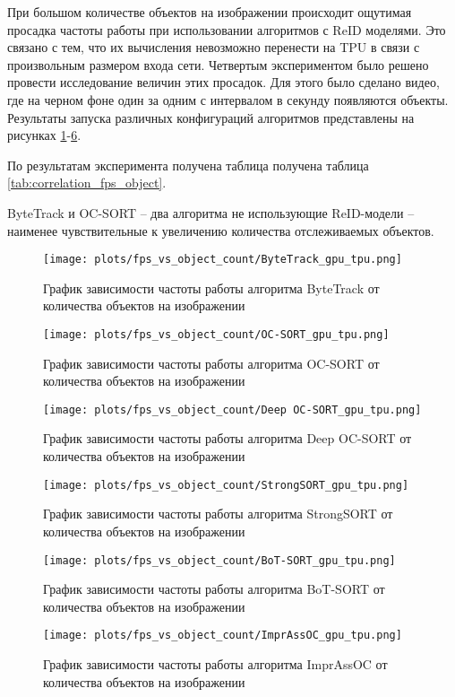 При большом количестве объектов на изображении происходит ощутимая просадка частоты работы при использовании алгоритмов с ReID моделями. 
Это связано с тем, что их вычисления невозможно перенести на TPU в связи с произвольным размером входа сети.  
Четвертым экспериментом было решено провести исследование величин этих просадок. Для этого было сделано видео, где на черном фоне один за одним с интервалом в секунду появляются объекты. 
Результаты запуска различных конфигураций алгоритмов представлены на рисунках \ref{fig:fps_object_ByteTrack}-\ref{fig:fps_object_ImprAssOC}.

По результатам эксперимента получена таблица получена таблица \ref{tab:correlation_fps_object}. 

ByteTrack и OC-SORT -- два алгоритма не использующие ReID-модели -- наименее чувствительные к увеличению количества отслеживаемых объектов.
\begin{figure}[ht]
    \centering
    \texttt{[image: plots/fps\_vs\_object\_count/ByteTrack\_gpu\_tpu.png]}
    \caption{График зависимости частоты работы алгоритма ByteTrack от количества объектов на изображении}
    \label{fig:fps_object_ByteTrack}
\end{figure}

\begin{figure}[ht]
    \centering
    \texttt{[image: plots/fps\_vs\_object\_count/OC-SORT\_gpu\_tpu.png]}
    \caption{График зависимости частоты работы алгоритма OC-SORT от количества объектов на изображении}
    \label{fig:fps_object_OC-SORT}
\end{figure}

\begin{figure}[ht]
    \centering
    \texttt{[image: plots/fps\_vs\_object\_count/Deep OC-SORT\_gpu\_tpu.png]}
    \caption{График зависимости частоты работы алгоритма Deep OC-SORT от количества объектов на изображении}
    \label{fig:fps_object_Deep OC-SORT}
\end{figure}

\begin{figure}[ht]
    \centering
    \texttt{[image: plots/fps\_vs\_object\_count/StrongSORT\_gpu\_tpu.png]}
    \caption{График зависимости частоты работы алгоритма StrongSORT от количества объектов на изображении}
    \label{fig:fps_object_StrongSORT}
\end{figure}

\begin{figure}[ht]
    \centering
    \texttt{[image: plots/fps\_vs\_object\_count/BoT-SORT\_gpu\_tpu.png]}
    \caption{График зависимости частоты работы алгоритма BoT-SORT от количества объектов на изображении}
    \label{fig:fps_object_BoT-SORT}
\end{figure}

\begin{figure}[ht]
    \centering
    \texttt{[image: plots/fps\_vs\_object\_count/ImprAssOC\_gpu\_tpu.png]}
    \caption{График зависимости частоты работы алгоритма ImprAssOC от количества объектов на изображении}
    \label{fig:fps_object_ImprAssOC}
\end{figure}
\FloatBarrier